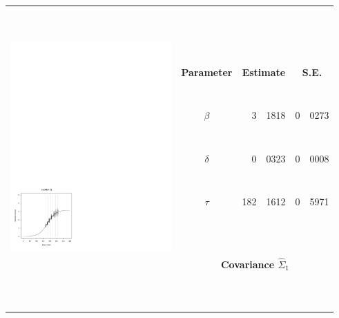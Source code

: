 


		\begin{tabular}{ccr@{.}lr@{.}l}
		\hline
		\hline
		 & &  \multicolumn{2}{c}{\ } & \multicolumn{2}{c}{\ } \\
		  & &  \multicolumn{2}{c}{\ } & \multicolumn{2}{c}{\ } \\
		 \multirow{10}{*}{ \includegraphics[height=80mm]{graphics/location_1.pdf}} &  \multicolumn{2}{c}{\ } & \multicolumn{2}{c}{\ } \\
		 & {\bf{Parameter}} & \multicolumn{2}{c}{{\bf{Estimate}}} & \multicolumn{2}{c}{{\bf{S.E.}}}  \\
		\cline{2-6}
		 & &  \multicolumn{2}{c}{\ } & \multicolumn{2}{c}{\ } \\
		& {\bf{$\beta$}} &	  3&1818		& 0&0273		\\
		 & &  \multicolumn{2}{c}{\ } & \multicolumn{2}{c}{\ } \\
		& {\bf{$\delta$}} &	  0&0323		& 0&0008		 \\
		 & &  \multicolumn{2}{c}{\ } & \multicolumn{2}{c}{\ } \\
		& {\bf{$\tau$}}	&	182&1612		& 0&5971		 \\
		 & &  \multicolumn{2}{c}{\ } & \multicolumn{2}{c}{\ } \\
		 & &  \multicolumn{2}{c}{\ } & \multicolumn{2}{c}{\ } \\
		 & \multicolumn{5}{c}{\bf{Covariance} $\hat{\Sigma}_1$ } \\
		\cline{2-6}
		& \multicolumn{5}{c}{ } \\
		 & &  \multicolumn{2}{c}{\ } & \multicolumn{2}{c}{\ } \\
		  & &  \multicolumn{2}{c}{\ } & \multicolumn{2}{c}{\ } \\
		 \hline
		\hline
		\end{tabular}


